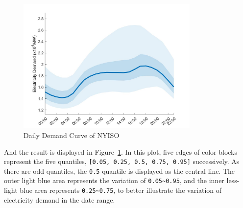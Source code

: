 \documentclass[11pt]{article}
\numberwithin{equation}{section}
\numberwithin{table}{section}
\numberwithin{figure}{section}
\begin{document}
\begin{figure}
  \centering
  \noindent\includegraphics[width=0.8\textwidth]{figures/visualization_plot_daily_demand_curve.jpg}
  \caption{Daily Demand Curve of NYISO} \label{fig:vis_1}
\end{figure}

And the result is displayed in Figure~\ref{fig:vis_1}. In this plot, five edges of color blocks represent the five quantiles, \verb![0.05, 0.25, 0.5, 0.75, 0.95]! successively. As there are odd quantiles, the \verb!0.5! quantile is displayed as the central line. The outer light blue area represents the variation of \verb!0.05~0.95!, and the inner less-light blue area represents \verb!0.25~0.75!, to better illustrate the variation of electricity demand in the date range.
\end{document}
